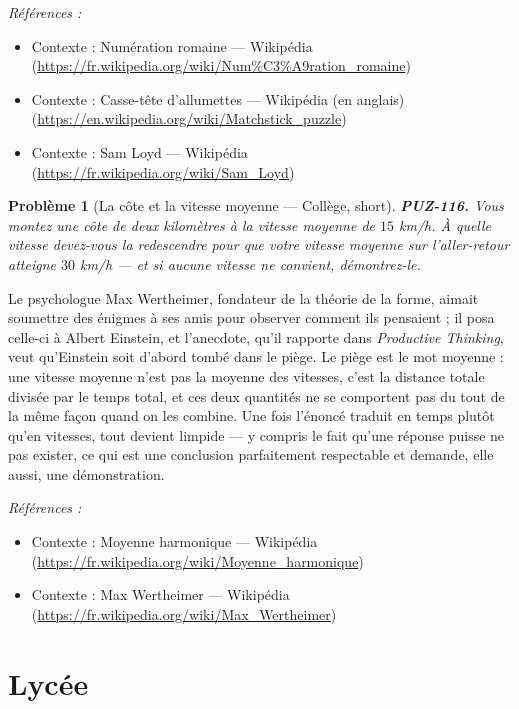 \documentclass[11pt]{article}
\newtheorem{problem}{Problème}
\newenvironment{refs}{\par\small\noindent\emph{Références :}\begin{itemize}\setlength\itemsep{0pt}}{\end{itemize}\normalsize}
\begin{document}
\begin{refs}
\item Contexte : Numération romaine --- Wikipédia (\url{https://fr.wikipedia.org/wiki/Num%C3%A9ration_romaine})
\item Contexte : Casse-tête d'allumettes --- Wikipédia (en anglais) (\url{https://en.wikipedia.org/wiki/Matchstick_puzzle})
\item Contexte : Sam Loyd --- Wikipédia (\url{https://fr.wikipedia.org/wiki/Sam_Loyd})
\end{refs}

\bigskip

\begin{problem}[{La côte et la vitesse moyenne --- Collège, short}]
\textbf{PUZ-116.} Vous montez une côte de deux kilomètres à la vitesse
moyenne de $ 15 $ km/h. À quelle vitesse devez-vous la redescendre pour que votre vitesse
moyenne sur l'aller-retour atteigne $ 30 $ km/h --- et si aucune vitesse ne convient,
démontrez-le.
\end{problem}

\noindent Le psychologue Max Wertheimer, fondateur de la théorie de la forme, aimait
soumettre des énigmes à ses amis pour observer comment ils pensaient ; il posa celle-ci à
Albert Einstein, et l'anecdote, qu'il rapporte dans \textit{Productive Thinking}, veut
qu'Einstein soit d'abord tombé dans le piège. Le piège est le mot \og{} moyenne \fg{} : une vitesse
moyenne n'est pas la moyenne des vitesses, c'est la distance totale divisée par le temps
total, et ces deux quantités ne se comportent pas du tout de la même façon quand on les
combine. Une fois l'énoncé traduit en temps plutôt qu'en vitesses, tout devient limpide --- y
compris le fait qu'une réponse puisse ne pas exister, ce qui est une conclusion parfaitement
respectable et demande, elle aussi, une démonstration.

\begin{refs}
\item Contexte : Moyenne harmonique --- Wikipédia (\url{https://fr.wikipedia.org/wiki/Moyenne_harmonique})
\item Contexte : Max Wertheimer --- Wikipédia (\url{https://fr.wikipedia.org/wiki/Max_Wertheimer})
\end{refs}

\bigskip


\section*{Lycée}
\end{document}
